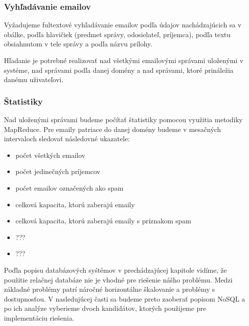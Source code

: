 \documentclass[11pt,twoside,a4paper]{book}
\begin{document}
\subsubsection{Vyhľadávanie emailov}
Vyžadujeme fultextové vyhľadávanie emailov podľa údajov nachádzajúcich sa v obálke, podľa hlavičiek (predmet správy, odosielateľ, príjemca), podľa textu obsiahnutom v tele správy a podľa názvu prílohy.

Hľadanie je potrebné realizovať nad všetkými emailovými správami uloženými v systéme, nad správami podľa danej domény a nad správami, ktoré prináležia danému uživateľovi.

\subsubsection{Štatistiky}
Nad uloženými správami budeme počítať štatistiky pomocou využitia metodiky MapReduce. Pre emaily patriace do danej domény budeme v mesačných intervaloch sledovať následovné ukazatele:

\begin{itemize}
  \item
  počet všetkých emailov
  \item
  počet jedinečných príjemcov
  \item
  počet emailov označených ako spam
  \item
  celková kapacita, ktorú zaberajú emaily
  \item
  celková kapacita, ktorú zaberajú emaily s príznakom spam
  \item
  ???
  \item
  ???
\end{itemize}



Poďla popisu databázových syśtémov v prechádzajúcej kapitole vidíme, že použitie relačnej databáze nie je vhodné pre riešenie nášho problému. Medzi základné problémy patrí náročné horizontálne škalovanie a problémy s dostupnosťou. V nasledujúcej časti sa budeme preto zaoberať popisom NoSQL a po ich analýze vyberieme dvoch kandidátov, ktorých použijeme pre implementáciu riešenia.
\end{document}
